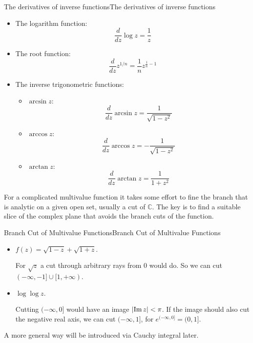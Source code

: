 \documentclass[../main.tex]{subfiles}
\begin{document}
\begin{proposition}{The derivatives of inverse functions}{The derivatives of inverse functions}
\begin{itemize}
\item The logarithm function:
	\begin{equation*}
	\frac{d}{dz} \log z = \frac{1}{z}
	\end{equation*}
\item The root function:
	\begin{equation*}
	\frac{d}{dz} z^{1/n} = \frac{1}{n} z^{\frac{1}{n}-1}
	\end{equation*}
\item The inverse trigonometric functions:
	\begin{itemize}
	\item $\arcsin z$:
		\begin{equation*}
		\frac{d}{dz} \arcsin z = \frac{1}{\sqrt{1-z^2}}
		\end{equation*}
	\item $\arccos z$:
		\begin{equation*}
		\frac{d}{dz} \arccos z = -\frac{1}{\sqrt{1-z^2}}
		\end{equation*}
	\item $\arctan z$:
		\begin{equation*}
		\frac{d}{dz} \arctan z = \frac{1}{1+z^2}
		\end{equation*}
	\end{itemize}
\end{itemize}
\end{proposition}

For a complicated multivalue function it takes some effort to fine the branch that is analytic on a given open set, usually a cut of $\mathbb{C}$. The key is to find a suitable slice of the complex plane that avoids the branch cuts of the function.

\begin{example}{Branch Cut of Multivalue Functions}{Branch Cut of Multivalue Functions}
\begin{itemize}
\item $f(z) = \sqrt{1-z}+\sqrt{1+z}$.

	For $\sqrt{z}$ a cut through arbitrary rays from $0$ would do. So we can cut $(-\infty ,-1] \cup [1,+\infty )$.
\item $\log \log z$.

	Cutting $(-\infty ,0]$ would have an image $\left|\operatorname{Im} z\right| < \pi$. If the image should also cut the negative real axis, we can cut $(-\infty ,1]$, for $e^{(-\infty ,0]} = (0,1]$.
\end{itemize}

A more general way will be introduced via Cauchy integral later.
\end{example}
\end{document}

